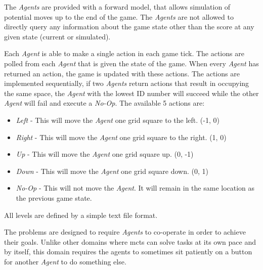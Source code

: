 \documentclass{IEEEtran}
\begin{document}
The \emph{Agents} are provided with a forward model, that allows simulation of potential moves up to the end of the game. The \emph{Agents} are not allowed to directly query any information about the game state other than the score at any given state (current or simulated).

Each \emph{Agent} is able to make a single action in each game tick. The actions are polled from each \emph{Agent} that is given the state of the game. When every \emph{Agent} has returned an action, the game is updated with these actions. The actions are implemented sequentially, if two \emph{Agents} return actions that result in occupying the same space, the \emph{Agent} with the lowest ID number will succeed while the other \emph{Agent} will fail and execute a \emph{No-Op}. The available 5 actions are:
\begin{itemize}
\item{\emph{Left} - This will move the \emph{Agent} one grid square to the left. (-1, 0)}
\item{\emph{Right} - This will move the \emph{Agent} one grid square to the right. (1, 0)}
\item{\emph{Up} - This will move the \emph{Agent} one grid square up. (0, -1)}
\item{\emph{Down} - This will move the \emph{Agent} one grid square down. (0, 1)}
\item{\emph{No-Op} - This will not move the \emph{Agent}. It will remain in the same location as the previous game state.}
\end{itemize}

All levels are defined by a simple text file format.

The problems are designed to require \emph{Agents} to co-operate in order to achieve their goals. Unlike other domains where \gls{mcts} can solve tasks at its own pace and by itself, this domain requires the agents to sometimes sit patiently on a button for another \emph{Agent} to do something else.
\end{document}
